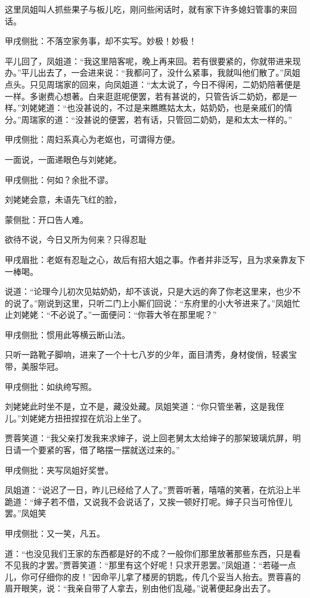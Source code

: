 \begin{parag}
    这里凤姐叫人抓些果子与板儿吃，刚问些闲话时，就有家下许多媳妇管事的来回话。\begin{note}甲戌侧批：不落空家务事，却不实写。妙极！妙极！\end{note}平儿回了，凤姐道：“我这里陪客呢，晚上再来回。若有很要紧的，你就带进来现办。”平儿出去了，一会进来说：“我都问了，没什么紧事，我就叫他们散了。”凤姐点头。只见周瑞家的回来，向凤姐道：“太太说了，今日不得闲，二奶奶陪著便是一样。多谢费心想著。白来逛逛呢便罢，若有甚说的，只管告诉二奶奶，都是一样。”刘姥姥道：“也没甚说的，不过是来瞧瞧姑太太，姑奶奶，也是亲戚们的情分。”周瑞家的道：“没甚说的便罢，若有话，只管回二奶奶，是和太太一样的。”\begin{note}甲戌侧批：周妇系真心为老妪也，可谓得方便。\end{note}一面说，一面递眼色与刘姥姥。\begin{note}甲戌侧批：何如？余批不谬。\end{note}刘姥姥会意，未语先飞红的脸，\begin{note}蒙侧批：开口告人难。\end{note}欲待不说，今日又所为何来？只得忍耻\begin{note}甲戌眉批：老妪有忍耻之心，故后有招大姐之事。作者并非泛写，且为求亲靠友下一棒喝。\end{note}说道：“论理今儿初次见姑奶奶，却不该说，只是大远的奔了你老这里来，也少不的说了。”刚说到这里，只听二门上小厮们回说：“东府里的小大爷进来了。”凤姐忙止刘姥姥：“不必说了。”一面便问：“你蓉大爷在那里呢？”\begin{note}甲戌侧批：惯用此等横云断山法。\end{note}只听一路靴子脚响，进来了一个十七八岁的少年，面目清秀，身材俊俏，轻裘宝带，美服华冠。\begin{note}甲戌侧批：如纨绔写照。\end{note}刘姥姥此时坐不是，立不是，藏没处藏。凤姐笑道：“你只管坐著，这是我侄儿。”刘姥姥方扭扭捏捏在炕沿上坐了。
\end{parag}


\begin{parag}
    贾蓉笑道：“我父亲打发我来求婶子，说上回老舅太太给婶子的那架玻璃炕屏，明日请一个要紧的客，借了略摆一摆就送过来的。”\begin{note}甲戌侧批：夹写凤姐好奖誉。\end{note}凤姐道：“说迟了一日，昨儿已经给了人了。”贾蓉听著，嘻嘻的笑著，在炕沿上半跪道：“婶子若不借，又说我不会说话了，又挨一顿好打呢。婶子只当可怜侄儿罢。”凤姐笑\begin{note}甲戌侧批：又一笑，凡五。\end{note}道：“也没见我们王家的东西都是好的不成？一般你们那里放著那些东西，只是看不见我的才罢。”贾蓉笑道：“那里有这个好呢！只求开恩罢。”凤姐道：“若碰一点儿，你可仔细你的皮！”因命平儿拿了楼房的钥匙，传几个妥当人抬去。贾蓉喜的眉开眼笑，说：“我亲自带了人拿去，别由他们乱碰。”说著便起身出去了。
\end{parag}


